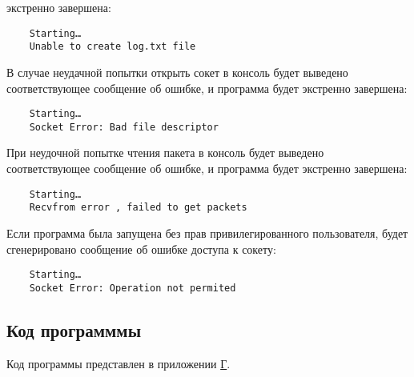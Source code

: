 экстренно завершена:
\begin{verbatim}
    Starting…
    Unable to create log.txt file
\end{verbatim}
В случае неудачной попытки открыть сокет в консоль будет выведено
соответствующее сообщение об ошибке\cite{linux_prog}, и программа будет экстренно
завершена:
\begin{verbatim}
    Starting…
    Socket Error: Bad file descriptor
\end{verbatim}
При неудочной попытке чтения пакета в консоль будет выведено
соответствующее сообщение об ошибке\cite{linux_prog}, и программа будет экстренно
завершена:
\begin{verbatim}
    Starting…
    Recvfrom error , failed to get packets
\end{verbatim}
Если программа была запущена без прав привилегированного пользователя,
будет сгенерировано сообщение об ошибке доступа к сокету:
\begin{verbatim}
    Starting…
    Socket Error: Operation not permited     
\end{verbatim}
\subsection{Код программмы}
Код программы представлен в приложении \hyperref[sec:appendix:code]{Г}.
